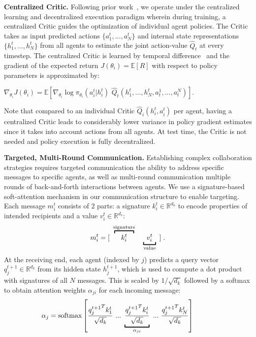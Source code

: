 \textbf{Centralized Critic.} Following prior work~\citep{lowe_nips17,foerster_aaai18},
we operate under the centralized learning and decentralized execution
paradigm wherein during training, a centralized Critic
guides the optimization of individual agent policies. The Critic takes as
input predicted actions $\{ a_1^t, ..., a_N^t \}$ and internal state
representations $\{h_1^t, ..., h_N^t \}$ from all agents to estimate the
joint action-value $\hat Q_t$ at every timestep. The centralized Critic
is learned by temporal difference~\citep{sutton_book98} and the gradient
of the expected return $J(\theta_i) = \mathbb{E}[R]$ with respect to
policy parameters is approximated by:

\resizebox{1. \columnwidth}{!}
{
$
    \nabla_{\theta_{i}} J(\theta_i) =
        \mathbb{E}
            \left[ \nabla_{\theta_{i}} \log \pi_{\theta_{i}} (a_i^t | h_i^t)
                \,\, \hat{Q}_{t} (h_1^t, ..., h_N^t, a_t^1, ..., a_t^N) \right].
$
}


Note that compared to an individual Critic $\hat{Q}_i(h_i^t, a_i^t)$ per agent,
having a centralized Critic leads to considerably lower variance
in policy gradient estimates since it takes into account actions from all agents.
At test time, the Critic is not needed and policy execution is
fully decentralized.

\textbf{Targeted, Multi-Round Communication.}
Establishing complex collaboration strategies requires targeted communication
\ie the ability to address specific messages to specific agents, as well as
multi-round communication \ie multiple rounds of back-and-forth interactions between
agents. We use a signature-based soft-attention mechanism in our communication
structure to enable targeting. Each message $m_i^t$ consists of $2$ parts:
a signature $k_i^t \in \mathbb{R}^{d_k}$ to encode properties of intended recipients
and a value $v_i^t \in \mathbb{R}^{d_v}$:
\begin{equation}\label{eq:message}
m_i^t = [\,\,\,\overbracket{\,\,\,\,\,\, k_i^t \,\,\,\,\,\,}^{\textnormal{signature}} \quad
    \underbracket{\,\,\, v_i^t \,\,\,}_{\textnormal{value}}\,\,\,] \;.
\end{equation}
At the receiving end, each agent (indexed by $j$) predicts a query
vector $q_j^{t+1} \in \mathbb{R}^{d_k}$ from its hidden state $h_j^{t+1}$,
which is used to compute a dot product with signatures of all $N$ messages.
This is scaled by $1 / \sqrt{d_k}$ followed by a softmax to
obtain attention weights $\alpha_{ji}$ for each incoming message:
\begin{equation}\label{eq:alpha}
\mathbf{\alpha}_{j} = \textnormal{softmax}\left[
\frac{{q_j^{t+1}}^T {k_1^t}}{\sqrt{d_k}} \,\, ... \,\,
    \underbracket{\frac{ {{q_j^{t+1}}^T {k_i^t}}}{\sqrt{d_k}}}_{\alpha_{ji}} \,\, ... \,\, \frac{{q_j^{t+1}}^T {k_N^t}}{\sqrt{d_k}} \right] \quad \quad \quad
\end{equation}

